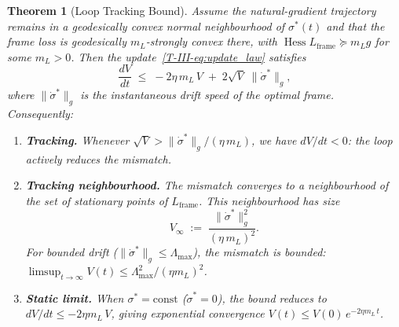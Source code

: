 \documentclass[12pt,a4paper,openany]{book}
\newtheorem{theorem}{Theorem}[chapter]
\begin{document}
\begin{theorem}[Loop Tracking Bound]
\label{T-III-thm:loop_stability}
Assume the natural-gradient trajectory remains in a geodesically convex
normal neighbourhood of $\sigma^*(t)$ and that the frame loss is
geodesically $m_L$-strongly convex there, with
$\operatorname{Hess}L_{\mathrm{frame}}\succeq m_L g$ for some
$m_L>0$.  Then the update~\eqref{T-III-eq:update_law} satisfies
\begin{equation}
\label{T-III-eq:lyapunov_decrease}
\frac{dV}{dt}
\;\leq\; -2\eta\,m_L\,V
\;+\; 2\sqrt{V}\;\bigl\|\dot{\sigma}^*\bigr\|_g,
\end{equation}
where $\|\dot{\sigma}^*\|_g$ is the instantaneous drift speed
of the optimal frame.
Consequently:
\begin{enumerate}
\item[\textup{(a)}] \textbf{Tracking.}
  Whenever $\sqrt{V} >
  \|\dot{\sigma}^*\|_g / (\eta\,m_L)$,
  we have $dV/dt < 0$: the loop actively reduces the
  mismatch.
\item[\textup{(b)}] \textbf{Tracking neighbourhood.}
  The mismatch converges to a neighbourhood of the set
  of stationary points of $L_{\mathrm{frame}}$.
  This neighbourhood has size
  \begin{equation}
  \label{T-III-eq:tracking_neighbourhood}
  V_\infty
  \;:=\; \frac{\bigl\|\dot{\sigma}^*\bigr\|_g^2}
  {(\eta\,m_L)^2}.
  \end{equation}
  For bounded drift
  ($\|\dot{\sigma}^*\|_g \leq \Lambda_{\max}$), the
  mismatch is bounded:
  $\limsup_{t\to\infty} V(t)
  \leq \Lambda_{\max}^2/(\eta m_L)^2$.
\item[\textup{(c)}] \textbf{Static limit.}
  When $\sigma^* = \mathrm{const}$
  ($\dot{\sigma}^* = 0$), the bound reduces to
  $dV/dt \leq -2\eta m_L\,V$,
  giving exponential convergence
  $V(t) \leq V(0)\,e^{-2\eta m_L\,t}$.
\end{enumerate}
\end{theorem}
\end{document}
